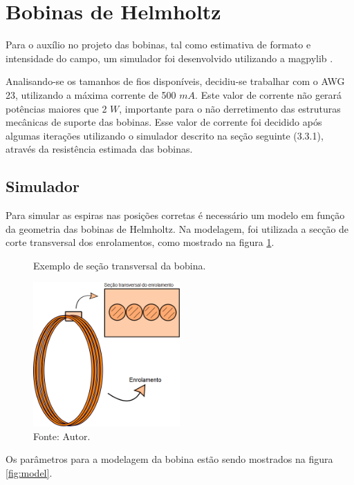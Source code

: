 \section{Bobinas de Helmholtz}

Para o auxílio no projeto das bobinas, tal como estimativa de formato e intensidade do campo, um simulador foi desenvolvido utilizando a magpylib \cite{magpy2020}.

Analisando-se os tamanhos de fios disponíveis, decidiu-se trabalhar com o AWG 23, utilizando a máxima corrente de 500 $mA$. Este valor de corrente não gerará potências maiores que 2 $W$, importante para o não derretimento das estruturas mecânicas de suporte das bobinas. Esse valor de corrente foi decidido após algumas iterações utilizando o simulador descrito na seção seguinte (3.3.1), através da resistência estimada das bobinas.

\subsection{Simulador}

Para simular as espiras nas posições corretas é necessário um modelo em função da geometria das bobinas de Helmholtz. Na modelagem, foi utilizada a secção de corte transversal dos enrolamentos, como mostrado na figura \ref{fig:cross}.

\begin{figure}[H]
    \centering
     \caption{Exemplo de seção transversal da bobina.}
     \includegraphics[width=0.5\textwidth]{./img/imagensExplicacoes/coil explanation.png}
     
     \caption*{Fonte: Autor.}\label{fig:cross}
\end{figure}

Os parâmetros para a modelagem da bobina estão sendo mostrados na figura \ref{fig:model}.

